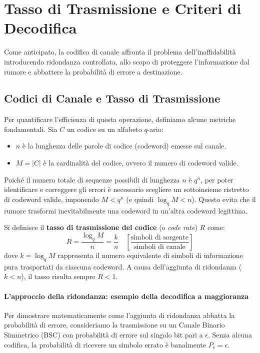 \section{Tasso di Trasmissione e Criteri di Decodifica}
Come anticipato, la codifica di canale affronta il problema dell'inaffidabilità introducendo ridondanza controllata, allo scopo di proteggere l'informazione dal rumore e abbattere la probabilità di errore a destinazione.

\subsection{Codici di Canale e Tasso di Trasmissione}
Per quantificare l'efficienza di questa operazione, definiamo alcune metriche fondamentali.
Sia $C$ un codice su un alfabeto $q$-ario:
\begin{itemize}
    \item $n$ è la lunghezza delle parole di codice (codeword) emesse sul canale.
    \item $M = |C|$ è la cardinalità del codice, ovvero il numero di codeword valide.
\end{itemize}

Poiché il numero totale di sequenze possibili di lunghezza $n$ è $q^n$, per poter identificare e correggere gli errori è necessario scegliere un sottoinsieme ristretto di codeword valide, imponendo $M < q^n$ (e quindi $\log_q M < n$). Questo evita che il rumore trasformi inevitabilmente una codeword in un'altra codeword legittima.

Si definisce il \textbf{tasso di trasmissione del codice} (o \textit{code rate}) $R$ come:
\[ R = \frac{\log_q M}{n} = \frac{k}{n} \quad \left[\frac{\text{simboli di sorgente}}{\text{simboli di canale}}\right] \]
dove $k = \log_q M$ rappresenta il numero equivalente di simboli di informazione pura trasportati da ciascuna codeword. A causa dell'aggiunta di ridondanza ($k < n$), il tasso risulta sempre $R < 1$.

\paragraph{L'approccio della ridondanza: esempio della decodifica a maggioranza}
Per dimostrare matematicamente come l'aggiunta di ridondanza abbatta la probabilità di errore, consideriamo la trasmissione su un Canale Binario Simmetrico (BSC) con probabilità di errore sul singolo bit pari a $\epsilon$. Senza alcuna codifica, la probabilità di ricevere un simbolo errato è banalmente $P_e = \epsilon$.


